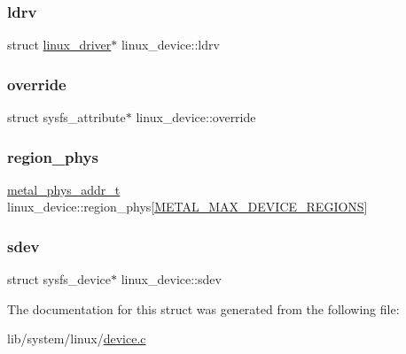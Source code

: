 \mbox{\label{structlinux__device_ae2c25385fa957c66ac9b1fbd9cba95a2}} 
\subsubsection{\texorpdfstring{ldrv}{ldrv}}
{\footnotesize\ttfamily struct \hyperlink{structlinux__driver}{linux\+\_\+driver}$\ast$ linux\+\_\+device\+::ldrv}

\mbox{\label{structlinux__device_a46d8713f354d53cfab2fe99eb10cb026}} 
\subsubsection{\texorpdfstring{override}{override}}
{\footnotesize\ttfamily struct sysfs\+\_\+attribute$\ast$ linux\+\_\+device\+::override}

\mbox{\label{structlinux__device_a2f8e2d069a9703f4e7a7f3073e8d9df2}} 
\subsubsection{\texorpdfstring{region\+\_\+phys}{region\_phys}}
{\footnotesize\ttfamily \hyperlink{group__system_gae024fa10b72199a3e26c29b6eb97df5d}{metal\+\_\+phys\+\_\+addr\+\_\+t} linux\+\_\+device\+::region\+\_\+phys\mbox{[}\hyperlink{system_2zephyr_2sys_8h_ade1e205242a3d9e8ec25535d263aa664}{M\+E\+T\+A\+L\+\_\+\+M\+A\+X\+\_\+\+D\+E\+V\+I\+C\+E\+\_\+\+R\+E\+G\+I\+O\+NS}\mbox{]}}

\mbox{\label{structlinux__device_a47abb7026acf68a8de75135e2a08fc21}} 
\subsubsection{\texorpdfstring{sdev}{sdev}}
{\footnotesize\ttfamily struct sysfs\+\_\+device$\ast$ linux\+\_\+device\+::sdev}



The documentation for this struct was generated from the following file\+:\begin{DoxyCompactItemize}
\item 
lib/system/linux/\hyperlink{system_2linux_2device_8c}{device.\+c}\end{DoxyCompactItemize}
